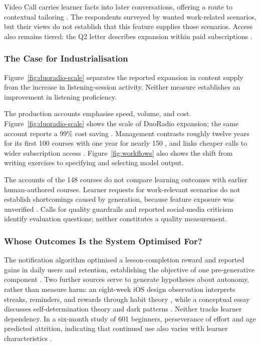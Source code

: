 \documentclass[11pt,titlepage]{article}
\begin{document}
Video Call carries learner facts into later conversations, offering a route to contextual tailoring \parencite{henry2025}. The respondents surveyed by \textcite{catalan2026} wanted work-related scenarios, but their views do not establish that this feature supplies those scenarios. Access also remains tiered: the Q2 letter describes expansion within paid subscriptions \parencite[p.~4]{shareholder2026}.

\subsubsection{The Case for Industrialisation}
Figure~\ref{fig:duoradio-scale} separates the reported expansion in content supply from the increase in listening-session activity. Neither measure establishes an improvement in listening proficiency.



The production accounts emphasise speed, volume, and cost. Figure~\ref{fig:duoradio-scale} shows the scale of DuoRadio expansion; the same account reports a 99\% cost saving \parencite{duoradio}. Management contrasts roughly twelve years for its first 100 courses with one year for nearly 150 \parencite{malikTechcrunch2025}, and links cheaper calls to wider subscription access \parencite{earnings2026}. Figure~\ref{fig:workflows} also shows the shift from writing exercises to specifying and selecting model output.

The accounts of the 148 courses do not compare learning outcomes with earlier human-authored courses. Learner requests for work-relevant scenarios do not establish shortcomings caused by generation, because feature exposure was unverified \parencite{catalan2026}. Calls for quality guardrails \parencite{hardman2025} and reported social-media criticism \parencite{malikTechcrunch2025} identify evaluation questions; neither constitutes a quality measurement.

\subsubsection{Whose Outcomes Is the System Optimised For?}
The notification algorithm optimised a lesson-completion reward and reported gains in daily users and retention, establishing the objective of one pre-generative component \parencite{yancey2020}. Two further sources serve to generate hypotheses about autonomy, rather than measure harm: an eight-week iOS design observation interprets streaks, reminders, and rewards through habit theory \parencite{maass2026}, while a conceptual essay discusses self-determination theory and dark patterns \parencite{espinosa2026}. Neither tracks learner dependency. In a six-month study of 601 beginners, perseverance of effort and age predicted attrition, indicating that continued use also varies with learner characteristics \parencite{sudina2025}.
\end{document}
